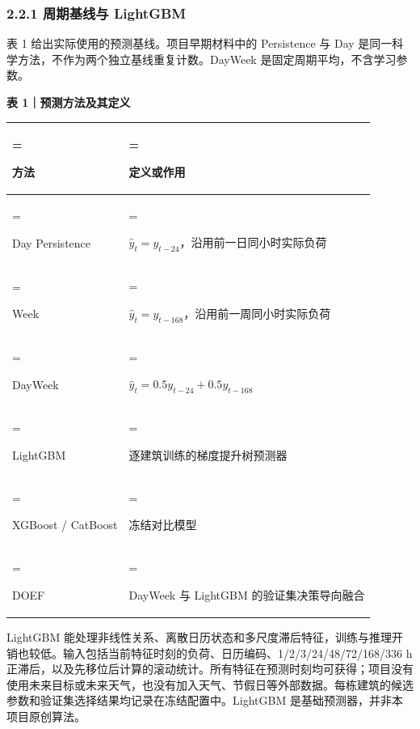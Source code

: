 \documentclass[12pt,a4paper]{article}
\begin{document}
\subsubsection{2.2.1 周期基线与 LightGBM}
表 1 给出实际使用的预测基线。项目早期材料中的 Persistence 与 Day 是同一科学方法，不作为两个独立基线重复计数。DayWeek 是固定周期平均，不含学习参数。\par
\par\noindent\begin{minipage}{\linewidth}\textbf{表 1｜预测方法及其定义}\par\smallskip\renewcommand{\arraystretch}{1.2}\begin{tabularx}{\linewidth}{>{\hsize=0.65\hsize\linewidth=\hsize\raggedright\arraybackslash}X>{\hsize=1.35\hsize\linewidth=\hsize\raggedright\arraybackslash}X}\toprule
方法 & 定义或作用\\\midrule
Day Persistence & \(\hat{y}_t=y_{t-24}\)，沿用前一日同小时实际负荷\\
Week & \(\hat{y}_t=y_{t-168}\)，沿用前一周同小时实际负荷\\
DayWeek & \(\hat{y}_t=0.5y_{t-24}+0.5y_{t-168}\)\\
LightGBM & 逐建筑训练的梯度提升树预测器\\
XGBoost / CatBoost & 冻结对比模型\\
DOEF & DayWeek 与 LightGBM 的验证集决策导向融合\\
\bottomrule\end{tabularx}\end{minipage}\par
LightGBM 能处理非线性关系、离散日历状态和多尺度滞后特征，训练与推理开销也较低。输入包括当前特征时刻的负荷、日历编码、1/2/3/24/48/72/168/336 h 正滞后，以及先移位后计算的滚动统计。所有特征在预测时刻均可获得；项目没有使用未来目标或未来天气，也没有加入天气、节假日等外部数据。每栋建筑的候选参数和验证集选择结果均记录在冻结配置中。LightGBM 是基础预测器，并非本项目原创算法。\par
\end{document}
